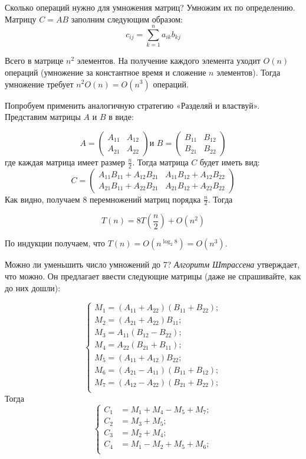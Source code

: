 \documentclass[a4paper, 12pt]{article}
\begin{document}
Сколько операций нужно для умножения матриц? Умножим их по определению. Матрицу
$C = AB$ заполним следующим образом:
\[c_{ij} = \sum\limits_{k = 1}^{n} a_{ik}b_{kj}\]

Всего в матрице $n^2$ элементов. На получение каждого элемента уходит $O(n)$ операций (умножение за константное время и сложение $n$ элементов). Тогда умножение требует $n^2O(n) = O(n^3)$
операций.

Попробуем применить аналогичную стратегию «Разделяй и властвуй». Представим
матрицы $A$ и $B$ в виде:

\[A = \begin{pmatrix}
A_{11} & A_{12}\\
A_{21} & A_{22}
\end{pmatrix}
\text{и } 
B = \begin{pmatrix}
B_{11} & B_{12}\\
B_{21} & B_{22}
\end{pmatrix}\]
где каждая матрица имеет размер $\frac{n}{2}$. Тогда матрица $C$ будет иметь вид:
\[C = \begin{pmatrix}
A_{11}B_{11}+A_{12}B_{21} & A_{11}B_{12}+A_{12}B_{22}\\
A_{21}B_{11}+A_{22}B_{21} & A_{21}B_{12}+A_{22}B_{22}
\end{pmatrix}\]
 Как видно, получаем 8 перемножений матриц порядка $\frac{n}{2}$. Тогда

\[T(n) = 8T\left( \frac{n}{2} \right) + O(n^2)\]

По индукции получаем, что $T(n) = O\left(n^{\log_{2} 8}\right) = O(n^{3})$.

Можно ли уменьшить число умножений до 7? \emph{Алгоритм Штрассена} утверждает,
что можно. Он предлагает ввести следующие матрицы (даже не спрашивайте, как до них дошли):

\[\begin{cases}
    M_1 = (A_{11} + A_{22})(B_{11} + B_{22}); \\
    M_2 = (A_{21} + A_{22})B_{11}; \\
    M_3 = A_{11}(B_{12} - B_{22}); \\
    M_4 = A_{22}(B_{21} + B_{11}); \\
    M_5 = (A_{11} + A_{12})B_{22}; \\
    M_6 = (A_{21} - A_{11})(B_{11} + B_{12}); \\
    M_7 = (A_{12} - A_{22})(B_{21} + B_{22}); \\
\end{cases}\]
Тогда
\[\begin{cases}
    C_1 &= M_1+M_4-M_5+M_7; \\
    C_2 &= M_3+M_5; \\
    C_3 &= M_2+M_4; \\
    C_4 &= M_1-M_2+M_5+M_6; \\
\end{cases}\]
\end{document}
